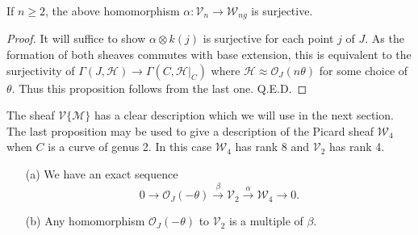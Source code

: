 \setcounter{proposition}{1}
\begin{proposition}\label{chap8-prop2}
If $n\geq 2$, the above homomorphism $\alpha:\mathscr{V}_{n}\to \mathscr{W}_{ng}$ is surjective. 
\end{proposition}

\begin{proof}
It will suffice to show $\alpha\otimes k(j)$ is surjective for each
point $j$ of $J$. As the formation of both sheaves commutes with base
extension, this is equivalent to the surjectivity of
$\Gamma(J,\mathscr{H})\to \Gamma(C,\mathscr{H}|_{C})$ where
$\mathscr{H}\approx \mathscr{O}_{J}(n\theta)$ for some choice of
$\theta$. Thus this proposition follows from the last one.\hfill
Q.E.D. 
\end{proof}

The sheaf $\mathscr{V}\{\mathscr{M}\}$ has a clear description which
we will use in the next section. The last proposition may be used to
give a description of the Picard sheaf $\mathscr{W}_{4}$ when $C$ is a
curve of genus 2. In this case $\mathscr{W}_{4}$ has rank 8 and
$\mathscr{V}_{2}$ has rank 4.

\begin{claim*}
\begin{itemize}
\item[(a)] We have an exact sequence
$$
0\to \mathscr{O}_{J}(-\theta)\xrightarrow{\beta}\mathscr{V}_{2}\xrightarrow{\alpha}\mathscr{W}_{4}\to 0.
$$

\item[(b)] Any homomorphism $\mathscr{O}_{J}(-\theta)$ to
$\mathscr{V}_{2}$ is a multiple of $\beta$.
\end{itemize}
\end{claim*}

